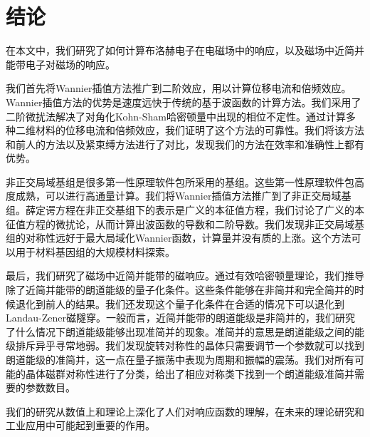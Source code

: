 \chapter{结论}

在本文中，我们研究了如何计算布洛赫电子在电磁场中的响应，以及磁场中近简并能带电子对磁场的响应。

我们首先将Wannier插值方法推广到二阶效应，用以计算位移电流和倍频效应。Wannier插值方法的优势是速度远快于传统的基于波函数的计算方法。我们采用了二阶微扰法解决了对角化Kohn-Sham哈密顿量中出现的相位不定性。通过计算多种二维材料的位移电流和倍频效应，我们证明了这个方法的可靠性。我们将该方法和前人的方法以及紧束缚方法进行了对比，发现我们的方法在效率和准确性上都有优势。

非正交局域基组是很多第一性原理软件包所采用的基组。这些第一性原理软件包高度成熟，可以进行高通量计算。我们将Wannier插值方法推广到了非正交局域基组。薛定谔方程在非正交基组下的表示是广义的本征值方程，我们讨论了广义的本征值方程的微扰论，从而计算出波函数的导数和二阶导数。我们发现非正交局域基组的对称性远好于最大局域化Wannier函数，计算量并没有质的上涨。这个方法可以用于材料基因组的大规模材料探索。

最后，我们研究了磁场中近简并能带的磁响应。通过有效哈密顿量理论，我们推导除了近简并能带的朗道能级的量子化条件。这些条件能够在非简并和完全简并的时候退化到前人的结果。我们还发现这个量子化条件在合适的情况下可以退化到Landau-Zener磁隧穿。一般而言，近简并能带的朗道能级是非简并的，我们研究了什么情况下朗道能级能够出现准简并的现象。准简并的意思是朗道能级之间的能级排斥异乎寻常地弱。我们发现旋转对称性的晶体只需要调节一个参数就可以找到朗道能级的准简并，这一点在量子振荡中表现为周期和振幅的震荡。我们对所有可能的晶体磁群对称性进行了分类，给出了相应对称类下找到一个朗道能级准简并需要的参数数目。

我们的研究从数值上和理论上深化了人们对响应函数的理解，在未来的理论研究和工业应用中可能起到重要的作用。